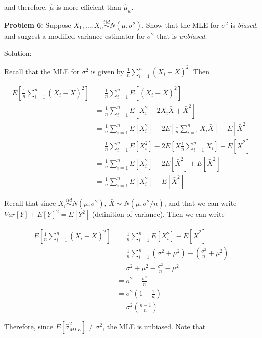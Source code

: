 \documentclass[
  letterpaper,
  DIV=11,
  numbers=noendperiod]{scrreprt}
\begin{document}
and therefore, \(\hat{\mu}\) is more efficient than \(\hat{\mu}_w\).

\textbf{Problem 6:} Suppose
\(X_1, \dots, X_n \overset{iid}{\sim} N(\mu, \sigma^2)\). Show that the
MLE for \(\sigma^2\) is \emph{biased}, and suggest a modified variance
estimator for \(\sigma^2\) that is \emph{unbiased}.

Solution:

Recall that the MLE for \(\sigma^2\) is given by
\(\frac{1}{n} \sum_{i = 1}^n (X_i - \bar{X})^2\). Then

\begin{align*}
    E\left[ \frac{1}{n} \sum_{i = 1}^n (X_i - \bar{X})^2\right] & = \frac{1}{n} \sum_{i = 1}^n E\left[ (X_i - \bar{X})^2\right] \\
    & = \frac{1}{n} \sum_{i = 1}^n E\left[ X_i^2 - 2X_i \bar{X} + \bar{X}^2\right] \\
    & = \frac{1}{n} \sum_{i = 1}^n E[X_i^2] - 2 E\left[ \frac{1}{n} \sum_{i = 1}^n X_i \bar{X} \right] + E[\bar{X}^2] \\
    & = \frac{1}{n} \sum_{i = 1}^n E[X_i^2] - 2 E\left[ \bar{X} \frac{1}{n} \sum_{i = 1}^n X_i  \right] + E[\bar{X}^2] \\
    & = \frac{1}{n} \sum_{i = 1}^n E[X_i^2] - 2 E\left[ \bar{X}^2  \right] + E[\bar{X}^2] \\
    & = \frac{1}{n} \sum_{i = 1}^n E[X_i^2] - E\left[ \bar{X}^2  \right] 
\end{align*}

Recall that since \(X_i \overset{iid}{\sim} N(\mu, \sigma^2)\),
\(\bar{X} \sim N(\mu, \sigma^2/n)\), and that we can write
\(Var[Y] + E[Y]^2 = E[Y^2]\) (definition of variance). Then we can write

\begin{align*}
    E\left[ \frac{1}{n} \sum_{i = 1}^n (X_i - \bar{X})^2 \right] & = \frac{1}{n} \sum_{i = 1}^n E[X_i^2] - E\left[ \bar{X}^2  \right] \\
    & = \frac{1}{n} \sum_{i = 1}^n \left( \sigma^2 + \mu^2 \right) - \left( \frac{\sigma^2}{n} + \mu^2 \right) \\
    & = \sigma^2 + \mu^2 - \frac{\sigma^2}{n} - \mu^2  \\
    & = \sigma^2 - \frac{\sigma^2}{n} \\
    & = \sigma^2 \left( 1 - \frac{1}{n} \right) \\
    & = \sigma^2  \left( \frac{n-1}{n} \right)
\end{align*}

Therefore, since \(E[\hat{\sigma}^2_{MLE}] \neq \sigma^2\), the MLE is
unbiased. Note that
\end{document}

